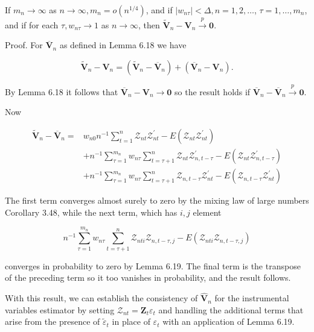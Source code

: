 \documentclass[10pt]{article}
\begin{document}
If $m_{n} \rightarrow \infty$ as $n \rightarrow \infty, m_{n}=o\left(n^{1 / 4}\right)$, and if $\left|w_{n \tau}\right|<\Delta, n=1,2, \ldots$, $\tau=1, \ldots, m_{n}$, and if for each $\tau, w_{n \tau} \rightarrow 1$ as $n \rightarrow \infty$, then $\tilde{\mathbf{V}}_{n}-\mathbf{V}_{n} \xrightarrow{p} \mathbf{0}$.

Proof. For $\overline{\mathbf{V}}_{n}$ as defined in Lemma 6.18 we have

$$
\tilde{\mathbf{V}}_{n}-\mathbf{V}_{n}=\left(\tilde{\mathbf{V}}_{n}-\overline{\mathbf{V}}_{n}\right)+\left(\overline{\mathbf{V}}_{n}-\mathbf{V}_{n}\right) .
$$

By Lemma 6.18 it follows that $\overline{\mathbf{V}}_{n}-\mathbf{V}_{n} \rightarrow \mathbf{0}$ so the result holds if $\overline{\mathbf{V}}_{n}- \overline{\mathbf{V}}_{n} \xrightarrow{p} \mathbf{0}$.

Now

$$
\begin{aligned}
\tilde{\mathbf{V}}_{n}-\overline{\mathbf{V}}_{n}= & w_{n 0} n^{-1} \sum_{t=1}^{n} \mathcal{Z}_{n t} \mathcal{Z}_{n t}^{\prime}-E\left(\mathcal{Z}_{n t} \mathcal{Z}_{n t}^{\prime}\right) \\
& +n^{-1} \sum_{\tau=1}^{m_{n}} w_{n \tau} \sum_{t=\tau+1}^{n} \mathcal{Z}_{n t} \mathcal{Z}_{n, t-\tau}^{\prime}-E\left(\mathcal{Z}_{n t} \mathcal{Z}_{n, t-\tau}^{\prime}\right) \\
& +n^{-1} \sum_{\tau=1}^{m_{n}} w_{n \tau} \sum_{t=\tau+1}^{n} \mathcal{Z}_{n, t-\tau} \mathcal{Z}_{n t}^{\prime}-E\left(\mathcal{Z}_{n, t-\tau} \mathcal{Z}_{n t}^{\prime}\right)
\end{aligned}
$$

The first term converges almost surely to zero by the mixing law of large numbers Corollary 3.48, while the next term, which has $i, j$ element

$$
n^{-1} \sum_{\tau=1}^{m_{n}} w_{n \tau} \sum_{t=\tau+1}^{n} \mathcal{Z}_{n t i} \mathcal{Z}_{n, t-\tau, j}-E\left(\mathcal{Z}_{n t i} \mathcal{Z}_{n, t-\tau, j}\right)
$$

converges in probability to zero by Lemma 6.19. The final term is the transpose of the preceding term so it too vanishes in probability, and the result follows.

With this result, we can establish the consistency of $\hat{\mathbf{V}}_{n}$ for the instrumental variables estimator by setting $\mathcal{Z}_{n t}=\mathbf{Z}_{t} \varepsilon_{t}$ and handling the additional terms that arise from the presence of $\tilde{\varepsilon}_{t}$ in place of $\varepsilon_{t}$ with an application of Lemma 6.19.
\end{document}
